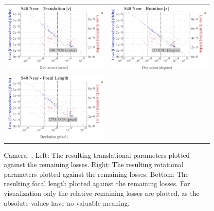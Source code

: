 \begin{figure}[!ht]
\begin{tabular}{cc}
    \includegraphics[width=0.45 \linewidth]{diagrams/calibration/s40_n_near/parameters.csv/Translation[z]_vs_Loss[Correspondences]_vs_Loss[Lambdas]_cluster_All.png} &
    \includegraphics[width=0.45 \linewidth]{diagrams/calibration/s40_n_near/parameters.csv/Rotation[z]_vs_Loss[Correspondences]_vs_Loss[Lambdas]_cluster_All.png} \\

    \includegraphics[width=0.45 \linewidth]{diagrams/calibration/s40_n_near/parameters.csv/FocalLength_vs_Loss[Correspondences]_vs_Loss[Lambdas]_cluster_All.png} &
\end{tabular}
\caption{
  Camera: .
  Left: The resulting translational parameters plotted against the remaining losses. 
  Right: The resulting rotational parameters plotted against the remaining losses.
  Bottom: The resulting focal length  plotted against the remaining losses.
  For visualization only the relative remaining losses are plotted, as the absolute values have no valuable meaning.
     }
\label{fig:static_calibration_algorithmic_error_s40_n_near}
\end{figure}


